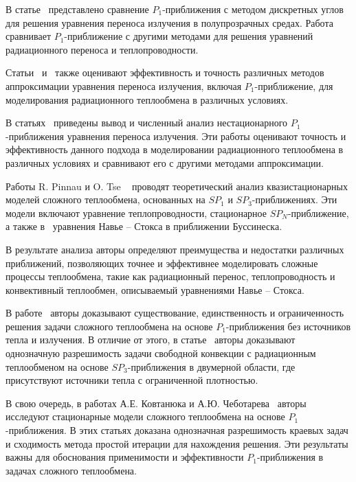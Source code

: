 В статье~\cite{kovtanyuk2012} представлено сравнение $P_1$-приближения с методом
дискретных углов для решения уравнения переноса излучения в полупрозрачных средах.
Работа~\cite{Thommes2002} сравнивает $P_1$-приближение с другими методами для решения
уравнений радиационного переноса и теплопроводности.

Статьи~\cite{Larsen2002} и~\cite{Frank2007} также оценивают эффективность и точность
различных методов аппроксимации уравнения переноса излучения,
включая $P_1$-приближение, для моделирования радиационного теплообмена в различных условиях.



В статьях~\cite{Addam2015, olbrant2013asymptotic, frank2010optimal, frank2011adaptive, Frank2007}
приведены вывод и численный анализ нестационарного $P_1$-приближения уравнения переноса излучения.
Эти работы оценивают точность и эффективность данного подхода в моделировании радиационного теплообмена
в различных условиях и сравнивают его с другими методами аппроксимации.

Работы R. Pinnau и O. Tse ~\cite{Pinnau2007, Pinnau2013} проводят теоретический анализ квазистационарных
моделей сложного теплообмена, основанных на $SP_1$ и $SP_3$-приближениях.
Эти модели включают уравнение теплопроводности, стационарное $SP_N$-приближение,
а также в~\cite{Pinnau2013} уравнения Навье – Стокса в приближении Буссинеска.

В результате анализа авторы определяют преимущества и недостатки различных приближений,
позволяющих точнее и эффективнее моделировать сложные процессы теплообмена, такие как радиационный перенос,
теплопроводность и конвективный теплообмен, описываемый уравнениями Навье – Стокса.


В работе~\cite{Pinnau2007} авторы доказывают существование, единственность и ограниченность
решения задачи сложного теплообмена на основе $P_1$-приближения без источников тепла и излучения.
В отличие от этого, в статье~\cite{Pinnau2013} авторы доказывают однозначную разрешимость задачи
свободной конвекции с радиационным теплообменом на основе $SP_3$-приближения в двумерной области,
где присутствуют источники тепла с ограниченной плотностью.

В свою очередь, в работах А.Е. Ковтанюка и А.Ю. Чеботарева~\cite{Kovtanyuk2014, Kovtanyuk2016, Kovtanyuk2015}
авторы исследуют стационарные модели сложного теплообмена на основе $P_1$-приближения.
В этих статьях доказана однозначная разрешимость краевых задач
и сходимость метода простой итерации для нахождения решения.
Эти результаты важны для обоснования применимости и
эффективности $P_1$-приближения в задачах сложного теплообмена.


